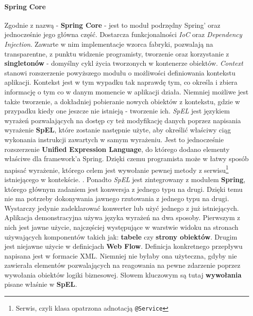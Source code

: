 	\paragraph{Spring Core}
		Zgodnie z nazwą - \textbf{Spring Core} - jest to moduł podrzędny Spring' oraz jednocześnie jego główna część. Dostarcza funkcjonalności \textit{IoC} oraz \textit{Dependency Injection}. 
		Zawarte w nim implementacje wzorca fabryki, pozwalają na transparentne, z punktu widzenie programisty, tworzenie oraz korzystanie z \textbf{singletonów} - domyślny cykl życia tworzonych w kontenerze obiektów. 
		\textit{Context} stanowi rozszerzenie powyższego modułu o możliwości definiowania kontekstu aplikacji. Kontekst jest w tym wypadku tak naprawdę tym, co określa i zbiera informację o tym co w danym momencie w aplikacji działa. Niemniej możliwe jest także tworzenie, a dokładniej pobieranie nowych obiektów z kontekstu, gdzie w przypadku kiedy one jeszcze nie istnieją - tworzenie ich.
		\textit{SpEL} jest językiem wyrażeń pozwalających na dostęp cy też modyfikację danych poprzez napisania wyrażenie \textbf{SpEL}, które zostanie następnie użyte, aby określić właściwy ciąg wykonania instrukcji zawartych w samym wyrażeniu. Jest to jednocześnie rozszerzenie \textbf{Unified Expression Language}, do którego dodano elementy właściwe dla framework'a Spring. Dzięki czemu programista może w łatwy sposób napisać wyrażenie, którego celem jest wywołanie pewnej metody z serwisu\footnote{Serwis, czyli klasa opatrzona adnotacją \texttt{@Service} } istniejącego w kontekście. \cite{unified_el}\cite{spring_documentation_reference}. Ponadto \textit{SpEL} jest zintegrowany z modułem \textbf{Spring}, którego głównym zadaniem jest konwersja z jednego typu na drugi. Dzięki temu nie ma potrzeby dokonywania jawnego rzutowania z jednego typu na drugi. Wystarczy jedynie zadeklarować konwerter lub użyć jednego z już istniejących.
		Aplikacja demonstracyjna używa języka wyrażeń na dwa sposoby. Pierwszym z nich jest jawne użycie, najczęściej występujące w warstwie widoku na stronach używających komponentów takich jak: \textbf{tabele} czy \textbf{strony obiektów}. Drugim jest niejawne użycie w definicjach \textbf{Web Flow}. Definicja konkretnego przepływu napisana jest w formacie XML. Niemniej nie byłaby ona użyteczna, gdyby nie zawierała elementów pozwalających na reagowania na pewne zdarzenie poprzez wywołania obiektów logiki biznesowej. Słowem kluczowym są tutaj \textbf{wywołania} pisane właśnie w \textbf{SpEL}. 	
		
